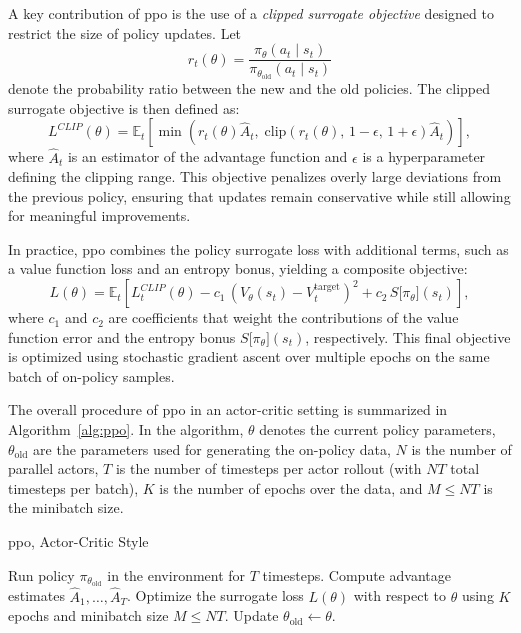 A key contribution of \gls{ppo} is the use of a \emph{clipped surrogate objective} designed to restrict the size of policy updates. Let
\[
r_t(\theta) = \frac{\pi_\theta(a_t \mid s_t)}{\pi_{\theta_{\text{old}}}(a_t \mid s_t)}
\]
denote the probability ratio between the new and the old policies. The clipped surrogate objective is then defined as:
\[
L^{CLIP}(\theta) = \mathbb{E}_t\!\left[\min\!\left(r_t(\theta)\hat{A}_t,\;\text{clip}\left(r_t(\theta),\,1-\epsilon,\,1+\epsilon\right)\hat{A}_t\right)\right],
\]
where \(\hat{A}_t\) is an estimator of the advantage function and \(\epsilon\) is a hyperparameter defining the clipping range. This objective penalizes overly large deviations from the previous policy, ensuring that updates remain conservative while still allowing for meaningful improvements.

In practice, \gls{ppo} combines the policy surrogate loss with additional terms, such as a value function loss and an entropy bonus, yielding a composite objective:
\[
L(\theta) = \mathbb{E}_t \left[ L^{CLIP}_t(\theta) - c_1\, \left(V_\theta(s_t) - V_t^{\text{target}}\right)^2 + c_2\, S\big[\pi_\theta\big](s_t) \right],
\]
where \(c_1\) and \(c_2\) are coefficients that weight the contributions of the value function error and the entropy bonus \(S\big[\pi_\theta\big](s_t)\), respectively. This final objective is optimized using stochastic gradient ascent over multiple epochs on the same batch of on-policy samples.

The overall procedure of \gls{ppo} in an actor-critic setting is summarized in Algorithm~\ref{alg:ppo}. In the algorithm, \(\theta\) denotes the current policy parameters, \(\theta_{\text{old}}\) are the parameters used for generating the on-policy data, \(N\) is the number of parallel actors, \(T\) is the number of timesteps per actor rollout (with \(NT\) total timesteps per batch), \(K\) is the number of epochs over the data, and \(M \le NT\) is the minibatch size.


\begin{algorithm}[H]
\caption{\gls{ppo}, Actor-Critic Style}
\label{alg:ppo}
\begin{algorithmic}[1]
        \State Run policy \(\pi_{\theta_{\text{old}}}\) in the environment for \(T\) timesteps.
        \State Compute advantage estimates \(\hat{A}_1, \dots, \hat{A}_T\).
    \EndFor
    \State Optimize the surrogate loss \(L(\theta)\) with respect to \(\theta\) using \(K\) epochs and minibatch size \(M \le NT\).
    \State Update \(\theta_{\text{old}} \leftarrow \theta\).
\EndFor
\end{algorithmic}
\end{algorithm}

